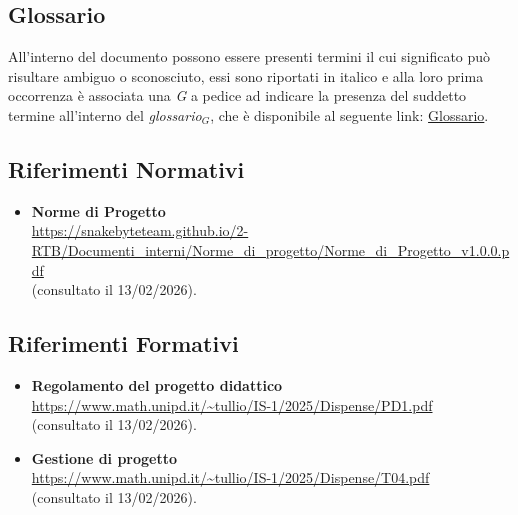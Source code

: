 \documentclass[10pt, letterpaper]{article}
\begin{document}
\subsection{Glossario}
All'interno del documento possono essere presenti termini il cui significato può risultare ambiguo o sconosciuto, essi sono
riportati in italico e alla loro prima occorrenza è associata una \textit{G} a pedice ad indicare la presenza del suddetto termine all'interno del \texorpdfstring{\textit{glossario$_G$}}{glossario}, che è disponibile al seguente link: \href{https://snakebyteteam.github.io/glossary.html}{Glossario}.

\subsection{Riferimenti Normativi}
\begin{itemize}
    \item \textbf{Norme di Progetto}
          \\ \url{https://snakebyteteam.github.io/2-RTB/Documenti_interni/Norme_di_progetto/Norme_di_Progetto_v1.0.0.pdf}
          \\ (consultato il 13/02/2026).
\end{itemize}

\subsection{Riferimenti Formativi}
\begin{itemize}
    \item \textbf{Regolamento del progetto didattico}\\
          \url{https://www.math.unipd.it/~tullio/IS-1/2025/Dispense/PD1.pdf}
          \\ (consultato il 13/02/2026).
    \item \textbf{Gestione di progetto}\\
          \url{https://www.math.unipd.it/~tullio/IS-1/2025/Dispense/T04.pdf}
          \\ (consultato il 13/02/2026).
\end{itemize}
\end{document}

